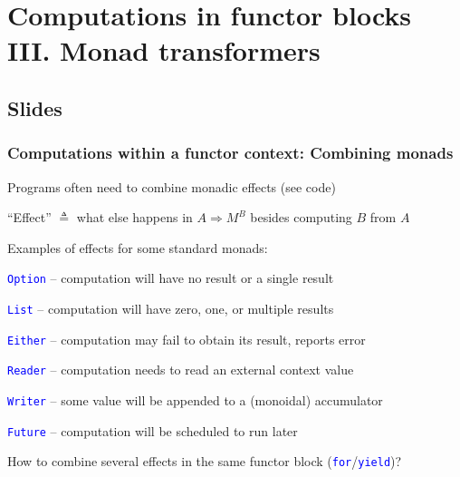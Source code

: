 
\chapter{Computations in functor blocks III. Monad transformers}

\section{Slides}

\subsection{Computations within a functor context: Combining monads}

Programs often need to combine monadic effects (see code)

``Effect'' $\triangleq$ what else happens in {\footnotesize{}$A\Rightarrow M^{B}$}
besides computing $B$ from $A$

Examples of effects for some standard monads:

\texttt{\textcolor{blue}{\footnotesize{}Option}} – computation will
have no result or a single result

\texttt{\textcolor{blue}{\footnotesize{}List}} – computation will
have zero, one, or multiple results

\texttt{\textcolor{blue}{\footnotesize{}Either}} – computation may
fail to obtain its result, reports error

\texttt{\textcolor{blue}{\footnotesize{}Reader}} – computation needs
to read an external context value

\texttt{\textcolor{blue}{\footnotesize{}Writer}} – some value will
be appended to a (monoidal) accumulator

\texttt{\textcolor{blue}{\footnotesize{}Future}} – computation will
be scheduled to run later

How to combine several effects in the same functor block (\texttt{\textcolor{blue}{\footnotesize{}for}}/\texttt{\textcolor{blue}{\footnotesize{}yield}})?

